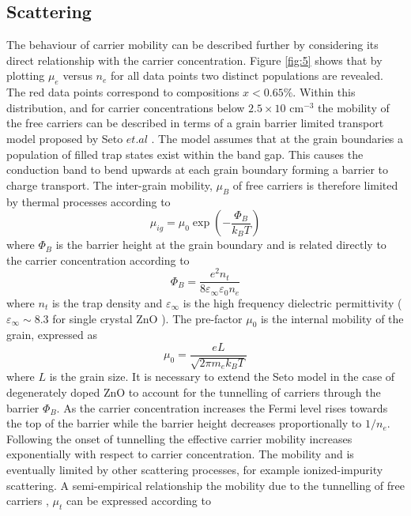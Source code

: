 \documentclass[final,5p,times]{elsarticle}
\begin{document}
\subsection{Scattering}
\label{sec:2.4}

The behaviour of carrier mobility can be described further by considering its direct relationship with the carrier concentration. Figure \ref{fig:5} shows that by plotting $\mu_e$ versus $n_e$ for all data points two distinct populations are revealed. The red data points correspond to compositions $x<0.65\%$. Within this distribution, and for carrier concentrations below $2.5\times10$ cm$^{-3}$ the mobility of the free carriers can be described in terms of a grain barrier limited transport  model proposed by  Seto $et. al$ \cite{Seto1975}. The model assumes that at the grain boundaries a population of filled trap states exist within the band gap. This causes the conduction band to bend upwards at each grain boundary forming a barrier to charge transport. The inter-grain mobility, $\mu_B$ of free carriers is therefore limited by thermal processes according to 
\begin{equation}
\label{eqn:10}
\mu_{ig} = \mu_0\exp(-\frac{\Phi_B}{k_BT})
\end{equation}
where $\Phi_B$ is the barrier height at the grain boundary and is related directly to the carrier concentration according to
\begin{equation}
\label{eqn:11}
\Phi_B=\frac{e^2n_t}{8\varepsilon_{\infty}\varepsilon_0n_e}
\end{equation}
where $n_t$ is the trap density and $\varepsilon_{\infty}$ is the high frequency dielectric permittivity ($\varepsilon_{\infty}\sim8.3$ for single crystal ZnO \cite{Ashkenov2003}). The pre-factor $\mu_0$ is the internal mobility of the grain, expressed as
\begin{equation}
\label{eqn:12}
\mu_0=\frac{eL}{\sqrt{2\pi m_ek_BT}}
\end{equation}
where $L$ is the grain size. It is necessary to extend the Seto model in the case of degenerately doped ZnO to account for the tunnelling of carriers through the barrier $\Phi_B$. As the carrier concentration increases the Fermi level rises towards the top of the barrier while the barrier height decreases proportionally to $1/n_e$. Following the onset of tunnelling the effective carrier mobility increases exponentially with respect to carrier concentration. The mobility and is eventually limited by other scattering processes, for example ionized-impurity scattering. A semi-empirical relationship the mobility due to the tunnelling of free carriers , $\mu_t$ can be expressed according to
\end{document}
